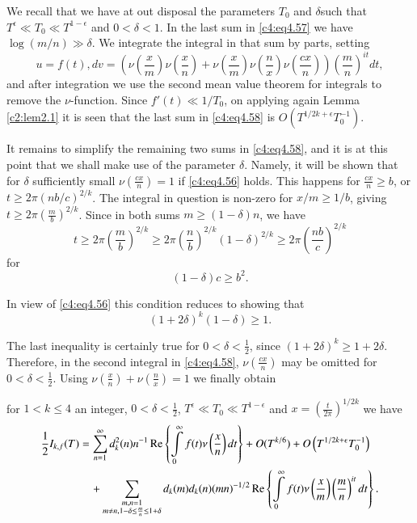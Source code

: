 We recall that we have at out disposal the parameters $T_0$ and
$\delta$\pageoriginale such that $T^\epsilon \ll T_0 \ll T^{1-
  \epsilon}$ and $0 < \delta < 1$. In the last sum in
\eqref{c4:eq4.57} we have $\log(m/n)\gg \delta$. We integrate the
integral in that sum by parts, setting
$$
u = f(t), dv = \left(\nu \left(\frac{x}{m} \right) \nu
\left(\frac{x}{n} \right)+ \nu \left(\frac{x}{m}\right) \nu
\left(\frac{n}{x}\right) \nu \left(\frac{cx}{n}\right) \right)
\left(\frac{m}{n}\right)^{it} dt, 
$$   
and after integration we use the second mean value theorem for
integrals to remove the $\nu$-function. Since $f'(t) \ll 1/T_0$, on
applying again Lemma \ref{c2:lem2.1} it is seen that the last sum in
\eqref{c4:eq4.58} is $O(T^{1/2 k+ \epsilon}T^{-1}_0)$.

It remains to simplify the remaining two sums in \eqref{c4:eq4.58},
and it is at this point that we shall make use of the parameter
$\delta$. Namely, it will be shown that for $\delta$ sufficiently
small $\nu \left(\frac{cx}{n} \right)=1$ if \eqref{c4:eq4.56}
holds. This happens for $\frac{cx}{n} \geq b$, or $t \geq 2 \pi
(nb/c)^{2/k}$. The integral in question is non-zero for $x/m\geq 1/b$,
giving $t \geq 2 \pi \left( \frac{m}{b}\right)^{2/k}$. Since in both
sums $m \geq (1- \delta)n$, we have
$$ 
t \geq 2 \pi \left(\frac{m}{b} \right)^{2/k} \geq 2\pi
\left(\frac{n}{b} \right)^{2/k} (1-\delta)^{2/k} \geq 2 \pi
\left(\frac{nb}{c} \right)^{2/k} 
$$ 
for
$$
(1- \delta)c \geq b^2.
$$

In view of \eqref{c4:eq4.56} this condition reduces to showing that
$$
(1+ 2 \delta)^k (1- \delta) \geq 1.
$$

The last inequality is certainly true for $0 < \delta < \frac{1}{2}$,
since $(1+ 2 \delta)^k \geq 1+ 2 \delta$. Therefore, in the second
integral in \eqref{c4:eq4.58}, $\nu \left( \frac{cx}{n}\right)$ may be
omitted for $0 < \delta < \frac{1}{2}$. Using $\nu \left(\frac{x}{n}
\right) + \nu \left( \frac{n}{x}\right)=1$ we finally obtain

\begin{thm}\label{c4:thm4.3}
  for $1 <  k \leq 4$ an integer, $0 < \delta < \frac{1}{2}$,
  $T^\epsilon \ll T_0 \ll T^{1- \epsilon}$ and $x= \left(\frac{t}{2
    \pi} \right)^{1/2k}$ we have
  {\fontsize{10}{12}\selectfont
  \begin{align}
    \frac{1}{2} I_{k, f} (T) & = \sum_{n=1}^\infty d_k^2 (n) n^{-1}
    \operatorname{Re} \left\{\int\limits_0^\infty f(t) \nu
    \left(\frac{x}{n}\right)dt \right\} + O(T^{k/6}) + O\left(T^{1/2k +
      \epsilon} T_0^{-1}\right)\label{c4:eq4.59}\\
    &\quad + \sum_{\substack{m, n=1\\m \neq n, 1- \delta \leq \frac{m}{n}
        \leq 1+ \delta}} d_k (m) d_k (n) (mn)^{-1/2} \operatorname{Re}
    \left\{\int\limits_0^\infty f(t) \nu \left(\frac{x}{m}
    \right)\left(\frac{m}{n} \right)^{it} dt\right\}.\notag
  \end{align}}
\end{thm}


